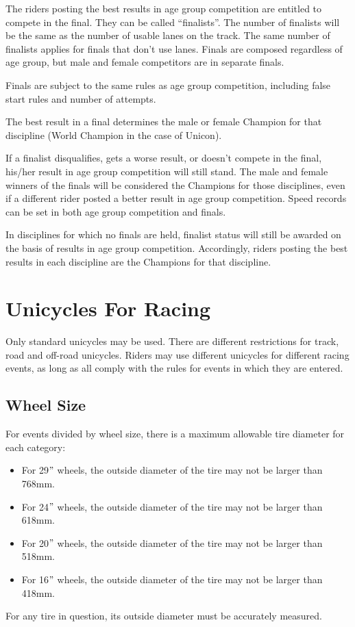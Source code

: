 The riders posting the best results in age group competition are entitled to compete in the final.
They can be called ``finalists''.
The number of finalists will be the same as the number of usable lanes on the track.
The same number of finalists applies for finals that don’t use lanes. 
Finals are composed regardless of age group, but male and female competitors are in separate finals.

Finals are subject to the same rules as age group competition, including false start rules and number of attempts.

The best result in a final determines the male or female Champion for that discipline (World Champion in the case of Unicon).

If a finalist disqualifies, gets a worse result, or doesn’t compete in the final, his/her result in age group competition will still stand.
The male and female winners of the finals will be considered the Champions for those disciplines, even if a different rider posted a better result in age group competition.
Speed records can be set in both age group competition and finals.

In disciplines for which no finals are held, finalist status will still be awarded on the basis of results in age group competition.
Accordingly, riders posting the best results in each discipline are the Champions for that discipline.

\section{Unicycles For Racing}
Only standard unicycles may be used.
There are different restrictions for track, road and off-road unicycles.
Riders may use different unicycles for different racing events, as long as all comply with the rules for events in which they are entered.

\subsection{Wheel Size}
For events divided by wheel size, there is a maximum allowable tire diameter for each category: 
\begin{itemize}
\item For 29$"$ wheels, the outside diameter of the tire may not be larger than 768mm.
\item For 24$"$ wheels, the outside diameter of the tire may not be larger than 618mm.
\item For 20$"$ wheels, the outside diameter of the tire may not be larger than 518mm.
\item For 16$"$ wheels, the outside diameter of the tire may not be larger than 418mm.
\end{itemize}
For any tire in question, its outside diameter must be accurately measured.

